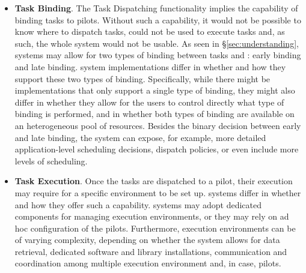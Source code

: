 \documentclass{sig-alternate}
\begin{document}
\begin{itemize}
\item \textbf{Task Binding}. The Task Dispatching functionality implies the
  capability of binding tasks to pilots. Without such a capability, it would
  not be possible to know where to dispatch tasks, \pilots could not be used to
  execute tasks and, as such, the whole \pilot system would not be usable. As
  seen in \S\ref{sec:understanding}, \pilot systems may allow for two types of
  binding between tasks and \pilots: early binding and late binding. \pilot
  system implementations differ in whether and how they support these two types
  of binding. Specifically, while there might be implementations that only
  support a single type of binding, they might also differ in whether they
  allow for the users to control directly what type of binding is performed,
  and in whether both types of binding are available on an heterogeneous pool
  of resources. Besides the binary decision between early and late binding, the
  \pilot system can expose, for example, more detailed application-level
  scheduling decisions, dispatch policies, or even include more levels of
  scheduling.


\item \textbf{Task Execution}. Once the tasks are dispatched to a pilot, their
  execution may require for a specific environment to be set up. \pilot systems
  differ in whether and how they offer such a capability. \pilot systems may
  adopt dedicated components for managing execution environments, or they may
  rely on ad hoc configuration of the pilots. Furthermore, execution
  environments can be of varying complexity, depending on whether the \pilot
  system allows for data retrieval, dedicated software and library
  installations, communication and coordination among multiple execution
  environment and, in case, pilots.



\end{itemize}
\end{document}
